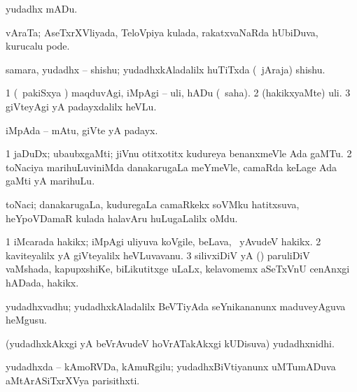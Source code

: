 \bentry
{} 
\gl{\akirx}
\bmng
yudadhx mADu. 
\emng
\eentry

\bentry
{} 
\gl{\saMkiSx}
\expl{}
\bmng
{} 
\emng
\eentry

\bentry
{} 
\gl{\nA}
\expl{}
\bmng
vAraTa; AseTxrXVliyada, TeloVpiya kulada, rakatxvaNaRda hUbiDuva, kurucalu pode. 
\emng
\eentry

\bentry
{} 
\gl{\nA}
\expl{}
\bmng
samara, yudadhx -- shishu; yudadhxkAladalilx huTiTxda (\kanmu\ jAraja) shishu. 
\emng
\eentry

\bentry
{} 
\gl{\sakirx}
\expl{}
\bmng
\bnum
\num{1} (\kanmu\ pakiSxya \vi) maqduvAgi, iMpAgi -- uli, hADu (\akirx\ saha). 
\num{2} (hakikxyaMte) uli. 
\num{3} giVteyAgi yA padayxdalilx heVLu. 
\enum
\emng
\eentry

\bentry
{} 
\gl{\nA}
\expl{}
\bmng
iMpAda -- mAtu, giVte yA padayx. 
\emng
\eentry

\bentry
{} 
\gl{\nA}
\expl{}
\bmng
\bnum
\num{1} jaDuDx; ubaubxgaMti; jiVnu otitxotitx kudureya benanxmeVle Ada gaMTu. 
\num{2} toNaciya marihuLuviniMda danakarugaLa meYmeVle, camaRda keLage Ada gaMti yA marihuLu. 
\enum
\emng
\eentry

\bentry
{} 
\gl{\nA}
\expl{}
\bmng
toNaci; danakarugaLa, kuduregaLa camaRkekx soVMku hatitxsuva, heYpoVDamaR kulada halavAru huLugaLalilx oMdu. 
\emng
\eentry

\bentry
{} 
\gl{\nA}
\expl{}
\bmng
\bnum
\num{1} iMcarada hakikx; iMpAgi uliyuva koVgile, beLava, \mo\ yAvudeV hakikx. 
\num{2} kaviteyalilx yA giVteyalilx heVLuvavanu. 
\num{3} silivxiDiV yA (\ame) paruliDiV vaMshada, kapupxshiKe, biLikutitxge uLaLx, kelavomemx aSeTxVnU cenAnxgi hADada, hakikx. 
\enum
\emng
\eentry

\bentry
{} 
\gl{\nA}
\expl{}
\bmng
yudadhxvadhu; yudadhxkAladalilx BeVTiyAda seYnikananunx maduveyAguva heMgusu. 
\emng
\eentry

\bentry
{} 
\gl{\nA}
\expl{}
\bmng
(yudadhxkAkxgi yA beVrAvudeV hoVrATakAkxgi kUDisuva) yudadhxnidhi. 
\emng
\eentry

\bentry
{} 
\gl{\nA}
\expl{}
\bmng
yudadhxda -- kAmoRVDa, kAmuRgilu; yudadhxBiVtiyanunx uMTumADuva aMtArASiTxrXVya parisithxti. 
\emng
\eentry

